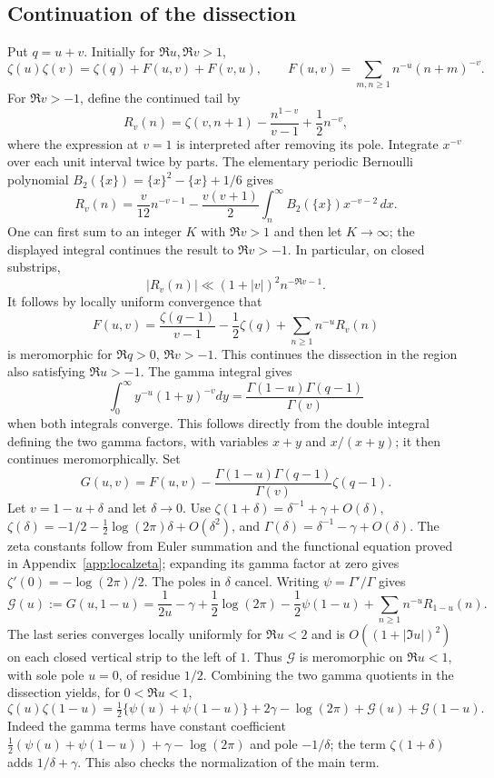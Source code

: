 \subsection{Continuation of the dissection}
Put $q=u+v$. Initially for $\Re u,\Re v>1$,
\[
 \zeta(u)\zeta(v)=\zeta(q)+F(u,v)+F(v,u),\qquad
 F(u,v)=\sum_{m,n\ge1}n^{-u}(n+m)^{-v}.
\]
For $\Re v>-1$, define the continued tail by
\[
 R_v(n)=\zeta(v,n+1)-\frac{n^{1-v}}{v-1}+\frac12n^{-v},
\]
where the expression at $v=1$ is interpreted after removing its pole.
Integrate $x^{-v}$ over each
unit interval twice by parts. The elementary periodic Bernoulli
polynomial $B_2(\{x\})=\{x\}^2-\{x\}+1/6$ gives
\begin{equation}\label{eq:EulerR}
 R_v(n)=\frac v{12}n^{-v-1}
   -\frac{v(v+1)}2\int_n^\infty B_2(\{x\})x^{-v-2}\,dx.
\end{equation}
One can first sum to an integer $K$ with $\Re v>1$ and then let
$K\to\infty$; the displayed integral continues the result to
$\Re v>-1$. In particular, on closed substrips,
\[
 |R_v(n)|\ll (1+|v|)^2n^{-\Re v-1}.
\]
It follows by locally uniform convergence that
\begin{equation}\label{eq:Fcontinue}
 F(u,v)=\frac{\zeta(q-1)}{v-1}-\frac12\zeta(q)
                              +\sum_{n\ge1}n^{-u}R_v(n)
\end{equation}
is meromorphic for $\Re q>0$, $\Re v>-1$. This continues the
dissection in the region also satisfying $\Re u>-1$.
The gamma integral gives
\[
 \int_0^\infty y^{-u}(1+y)^{-v}dy
       =\frac{\Gamma(1-u)\Gamma(q-1)}{\Gamma(v)}
\]
when both integrals converge. This follows directly from the double
integral defining the two gamma factors, with variables $x+y$ and
$x/(x+y)$; it then continues meromorphically.
Set
\[
 G(u,v)=F(u,v)-\frac{\Gamma(1-u)\Gamma(q-1)}{\Gamma(v)}\zeta(q-1).
\]
Let $v=1-u+\delta$ and let $\delta\to0$.
Use $\zeta(1+\delta)=\delta^{-1}+\gamma+O(\delta)$,
$\zeta(\delta)=-1/2-\tfrac12\log(2\pi)\delta+O(\delta^2)$,
and $\Gamma(\delta)=\delta^{-1}-\gamma+O(\delta)$.
The zeta constants follow from Euler summation and the functional
equation proved in Appendix~\ref{app:localzeta}; expanding its gamma
factor at zero gives $\zeta'(0)=-\log(2\pi)/2$.
The poles in $\delta$ cancel. Writing $\psi=\Gamma'/\Gamma$ gives
\begin{equation}\label{eq:Gexplicit}
 \mathcal G(u):=G(u,1-u)
 =\frac1{2u}-\gamma+\frac12\log(2\pi)-\frac12\psi(1-u)
                      +\sum_{n\ge1}n^{-u}R_{1-u}(n).
\end{equation}
The last series converges locally uniformly for $\Re u<2$ and is
$O((1+|\Im u|)^2)$ on each closed vertical strip to the left of $1$.
Thus $\mathcal G$ is meromorphic on $\Re u<1$, with sole pole
$u=0$, of residue $1/2$. Combining the two gamma quotients in the
dissection yields, for $0<\Re u<1$,
\begin{equation}\label{eq:exactdissection}
 \zeta(u)\zeta(1-u)=
 \tfrac12\{\psi(u)+\psi(1-u)\}+2\gamma-\log(2\pi)
                         +\mathcal G(u)+\mathcal G(1-u).
\end{equation}
Indeed the gamma terms have constant coefficient
$\tfrac12(\psi(u)+\psi(1-u))+\gamma-\log(2\pi)$ and
pole $-1/\delta$; the term $\zeta(1+\delta)$ adds $1/\delta+\gamma$.
This also checks the normalization of the main term.

